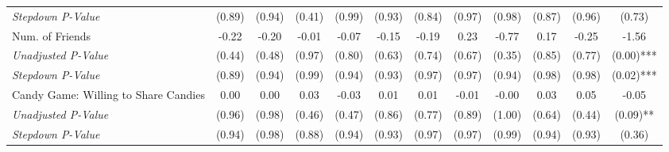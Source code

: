 \begin{tabular}{l c c c c c c c c c c c}
\quad \textit{Stepdown P-Value} & (0.89) & (0.94) & (0.41) & (0.99) & (0.93) & (0.84) & (0.97) & (0.98) & (0.87) & (0.96) & (0.73) \\
Num. of Friends & -0.22 & -0.20 & -0.01 & -0.07 & -0.15 & -0.19 & 0.23 & -0.77 & 0.17 & -0.25 & -1.56 \\
\quad \textit{Unadjusted P-Value} & (0.44) & (0.48) & (0.97) & (0.80) & (0.63) & (0.74) & (0.67) & (0.35) & (0.85) & (0.77) & (0.00)*** \\
\quad \textit{Stepdown P-Value} & (0.89) & (0.94) & (0.99) & (0.94) & (0.93) & (0.97) & (0.97) & (0.94) & (0.98) & (0.98) & (0.02)*** \\
Candy Game: Willing to Share Candies & 0.00 & 0.00 & 0.03 & -0.03 & 0.01 & 0.01 & -0.01 & -0.00 & 0.03 & 0.05 & -0.05 \\
\quad \textit{Unadjusted P-Value} & (0.96) & (0.98) & (0.46) & (0.47) & (0.86) & (0.77) & (0.89) & (1.00) & (0.64) & (0.44) & (0.09)** \\
\quad \textit{Stepdown P-Value} & (0.94) & (0.98) & (0.88) & (0.94) & (0.93) & (0.97) & (0.97) & (0.99) & (0.94) & (0.93) & (0.36) \\
\bottomrule
\end{tabular}
